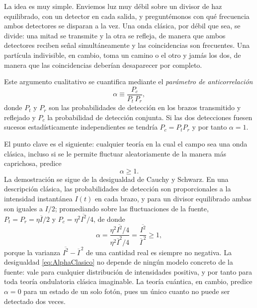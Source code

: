             La idea es muy simple. Enviemos luz muy débil sobre un divisor de haz equilibrado, con un detector en cada salida, y preguntémonos con qué frecuencia ambos detectores se disparan a la vez. Una onda clásica, por débil que sea, se divide: una mitad se transmite y la otra se refleja, de manera que ambos detectores reciben señal simultáneamente y las coincidencias son frecuentes. Una partícula indivisible, en cambio, toma un camino o el otro y jamás los dos, de manera que las coincidencias deberían desaparecer por completo.

            Este argumento cualitativo se cuantifica mediante el \textit{parámetro de anticorrelación}
            \begin{equation}\label{eq:ParametroAlpha}
                \alpha \equiv \frac{P_{c}}{P_{t}\,P_{r}},
            \end{equation}
            donde $P_{t}$ y $P_{r}$ son las probabilidades de detección en los brazos transmitido y reflejado y $P_{c}$ la probabilidad de detección conjunta. Si las dos detecciones fuesen sucesos estadísticamente independientes se tendría $P_{c} = P_{t}P_{r}$ y por tanto $\alpha = 1$.

            El punto clave es el siguiente: cualquier teoría en la cual el campo sea una onda clásica, incluso si se le permite fluctuar aleatoriamente de la manera más caprichosa, predice
            \begin{equation}\label{eq:DesigualdadClasica}
                \alpha \geq 1 .
            \end{equation}
            La demostración se sigue de la desigualdad de Cauchy y Schwarz. En una descripción clásica, las probabilidades de detección son proporcionales a la intensidad instantánea $I(t)$ en cada brazo, y para un divisor equilibrado ambas son iguales a $I/2$; promediando sobre las fluctuaciones de la fuente, $P_{t} = P_{r} = \eta\overline{I}/2$ y $P_{c} = \eta^{2}\overline{I^{2}}/4$, de donde
            \begin{equation}\label{eq:AlphaClasico}
                \alpha = \frac{\eta^{2}\overline{I^{2}}/4}{\eta^{2}\overline{I}^{2}/4} = \frac{\overline{I^{2}}}{\overline{I}^{\,2}} \geq 1,
            \end{equation}
            porque la varianza $\overline{I^{2}} - \overline{I}^{\,2}$ de una cantidad real es siempre no negativa. La desigualdad \eqref{eq:AlphaClasico} no depende de ningún modelo concreto de la fuente: vale para cualquier distribución de intensidades positiva, y por tanto para toda teoría ondulatoria clásica imaginable. La teoría cuántica, en cambio, predice $\alpha = 0$ para un estado de un solo fotón, pues un único cuanto no puede ser detectado dos veces.

